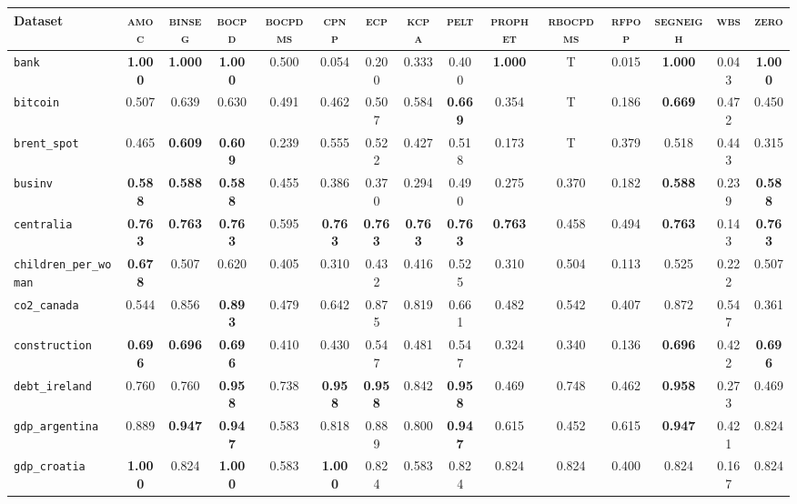 \begin{tabular}{lcccccccccccccc}
Dataset & \textsc{amoc} & \textsc{binseg} & \textsc{bocpd} & \textsc{bocpdms} & \textsc{cpnp} & \textsc{ecp} & \textsc{kcpa} & \textsc{pelt} & \textsc{prophet} & \textsc{rbocpdms} & \textsc{rfpop} & \textsc{segneigh} & \textsc{wbs} & \textsc{zero}\\
\hline
\verb+bank+ & \textbf{1.000} & \textbf{1.000} & \textbf{1.000} & 0.500 & 0.054 & 0.200 & 0.333 & 0.400 & \textbf{1.000} & T & 0.015 & \textbf{1.000} & 0.043 & \textbf{1.000}\\
\verb+bitcoin+ & 0.507 & 0.639 & 0.630 & 0.491 & 0.462 & 0.507 & 0.584 & \textbf{0.669} & 0.354 & T & 0.186 & \textbf{0.669} & 0.472 & 0.450\\
\verb+brent_spot+ & 0.465 & \textbf{0.609} & \textbf{0.609} & 0.239 & 0.555 & 0.522 & 0.427 & 0.518 & 0.173 & T & 0.379 & 0.518 & 0.443 & 0.315\\
\verb+businv+ & \textbf{0.588} & \textbf{0.588} & \textbf{0.588} & 0.455 & 0.386 & 0.370 & 0.294 & 0.490 & 0.275 & 0.370 & 0.182 & \textbf{0.588} & 0.239 & \textbf{0.588}\\
\verb+centralia+ & \textbf{0.763} & \textbf{0.763} & \textbf{0.763} & 0.595 & \textbf{0.763} & \textbf{0.763} & \textbf{0.763} & \textbf{0.763} & \textbf{0.763} & 0.458 & 0.494 & \textbf{0.763} & 0.143 & \textbf{0.763}\\
\verb+children_per_woman+ & \textbf{0.678} & 0.507 & 0.620 & 0.405 & 0.310 & 0.432 & 0.416 & 0.525 & 0.310 & 0.504 & 0.113 & 0.525 & 0.222 & 0.507\\
\verb+co2_canada+ & 0.544 & 0.856 & \textbf{0.893} & 0.479 & 0.642 & 0.875 & 0.819 & 0.661 & 0.482 & 0.542 & 0.407 & 0.872 & 0.547 & 0.361\\
\verb+construction+ & \textbf{0.696} & \textbf{0.696} & \textbf{0.696} & 0.410 & 0.430 & 0.547 & 0.481 & 0.547 & 0.324 & 0.340 & 0.136 & \textbf{0.696} & 0.422 & \textbf{0.696}\\
\verb+debt_ireland+ & 0.760 & 0.760 & \textbf{0.958} & 0.738 & \textbf{0.958} & \textbf{0.958} & 0.842 & \textbf{0.958} & 0.469 & 0.748 & 0.462 & \textbf{0.958} & 0.273 & 0.469\\
\verb+gdp_argentina+ & 0.889 & \textbf{0.947} & \textbf{0.947} & 0.583 & 0.818 & 0.889 & 0.800 & \textbf{0.947} & 0.615 & 0.452 & 0.615 & \textbf{0.947} & 0.421 & 0.824\\
\verb+gdp_croatia+ & \textbf{1.000} & 0.824 & \textbf{1.000} & 0.583 & \textbf{1.000} & 0.824 & 0.583 & 0.824 & 0.824 & 0.824 & 0.400 & 0.824 & 0.167 & 0.824\\

\end{tabular}
